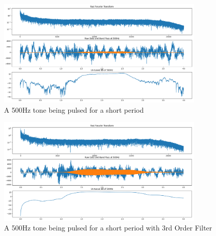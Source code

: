\documentclass{article}
\begin{document}
\begin{figure}
	\centering
	\includegraphics[width=10cm]{pulse500HzFar}
	\caption{A 500Hz tone being pulsed for a short period}
	\label{fig:signalShapeOverlay}
\end{figure}

\begin{figure}
	\centering
	\includegraphics[width=10cm]{500Hz3order}
	\caption{A 500Hz tone being pulsed for a short period with 3rd Order Filter}
	\label{fig:signalShapeOverlay}
\end{figure}
\end{document}
